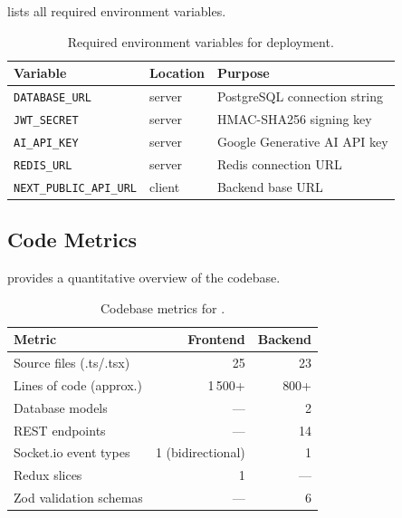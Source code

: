  lists all required environment variables.

\begin{table}[H]
  \centering
  \caption{Required environment variables for \echoray{} deployment.}
  \label{tab:envvars}
  \begin{tabular}{lll}
    \toprule
    \textbf{Variable}         & \textbf{Location} & \textbf{Purpose} \\
    \midrule
    \texttt{DATABASE\_URL}    & server            & PostgreSQL connection string \\
    \texttt{JWT\_SECRET}      & server            & HMAC-SHA256 signing key \\
    \texttt{AI\_API\_KEY}     & server            & Google Generative AI API key \\
    \texttt{REDIS\_URL}       & server            & Redis connection URL \\
    \texttt{NEXT\_PUBLIC\_API\_URL} & client     & Backend base URL \\
    \bottomrule
  \end{tabular}
\end{table}

\subsection{Code Metrics}

 provides a quantitative overview of the codebase.

\begin{table}[H]
  \centering
  \caption{Codebase metrics for \echoray{}.}
  \label{tab:codemetrics}
  \begin{tabular}{lrr}
    \toprule
    \textbf{Metric}            & \textbf{Frontend} & \textbf{Backend} \\
    \midrule
    Source files (.ts/.tsx)    & 25                & 23 \\
    Lines of code (approx.)    & 1\,500+           & 800+ \\
    Database models            & ---               & 2 \\
    REST endpoints             & ---               & 14 \\
    Socket.io event types      & 1 (bidirectional) & 1 \\
    Redux slices               & 1                 & --- \\
    Zod validation schemas     & ---               & 6 \\
    \bottomrule
  \end{tabular}
\end{table}
